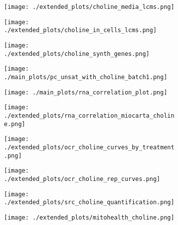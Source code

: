 \begin{figure}[ht]
    \begin{subfigure}[t]{.6\textwidth}
        \caption{}
        \texttt{[image: ./extended\_plots/choline\_media\_lcms.png]}        
    \end{subfigure}
    \begin{subfigure}[t]{.35\textwidth}
        \caption{}
        \texttt{[image: ./extended\_plots/choline\_in\_cells\_lcms.png]}        
    \end{subfigure}
    \begin{subfigure}[t]{.25\textwidth}
        \caption{}
        \texttt{[image: ./extended\_plots/choline\_synth\_genes.png]}        
    \end{subfigure}
    \begin{subfigure}[t]{.35\textwidth}
        \caption{}
        \texttt{[image: ./main\_plots/pc\_unsat\_with\_choline\_batch1.png]}        
    \end{subfigure} 
    \begin{subfigure}[t]{0.25\textwidth}
        \caption{}
        \texttt{[image: ./main\_plots/rna\_correlation\_plot.png]}        
    \end{subfigure}  
    \begin{subfigure}[t]{.2\textwidth}
        \caption{}
        \texttt{[image: ./extended\_plots/rna\_correlation\_miocarta\_choline.png]}        
    \end{subfigure}
    \begin{subfigure}[t]{.25\textwidth}
        \caption{}
        \texttt{[image: ./extended\_plots/ocr\_choline\_curves\_by\_treatment.png]}        
    \end{subfigure}
    \begin{subfigure}[t]{.25\textwidth}
        \caption{}
        \texttt{[image: ./extended\_plots/ocr\_choline\_rep\_curves.png]}        
    \end{subfigure}
    \begin{subfigure}[t]{.2\textwidth}
        \caption{}
        \texttt{[image: ./extended\_plots/src\_choline\_quantification.png]}        
    \end{subfigure}
    \begin{subfigure}[t]{.2\textwidth}
        \caption{}
        \texttt{[image: ./extended\_plots/mitohealth\_choline.png]}        
    \end{subfigure}

\end{figure}
